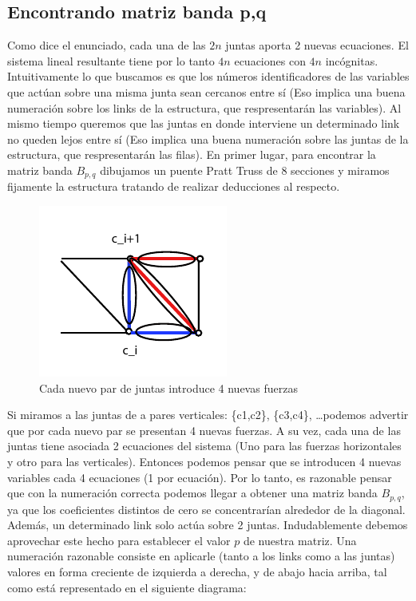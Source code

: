 \subsection{Encontrando matriz banda p,q}

Como dice el enunciado, cada una de las $2n$ juntas aporta 2 nuevas ecuaciones. El sistema lineal resultante tiene por lo tanto $4n$ ecuaciones con $4n$ incógnitas.
Intuitivamente lo que buscamos es que los números identificadores de las variables que actúan sobre una misma junta sean cercanos entre sí (Eso implica una buena numeración sobre los links de la estructura,
que respresentarán las variables).
Al mismo tiempo queremos que las juntas en donde interviene un determinado link no queden lejos entre sí (Eso implica una buena numeración sobre las juntas de la estructura, que respresentarán las filas).
En primer lugar, para encontrar la matriz banda $B_{p,q}$ dibujamos un puente Pratt Truss de 8 secciones y miramos fijamente la estructura tratando de realizar deducciones al respecto.

\begin{figure}[!h]
	\begin{center}
		  \includegraphics[keepaspectratio]{Imagenes/im_3.pdf}
		  \caption{Cada nuevo par de juntas introduce 4 nuevas fuerzas}
		  \label{fig:contra1}
	\end{center}
\end{figure}
\FloatBarrier

Si miramos a las juntas de a pares verticales: \{c1,c2\}, \{c3,c4\}, \ldots podemos advertir que por cada nuevo par se presentan 4 nuevas fuerzas. A su vez, cada una de las juntas tiene asociada 2 ecuaciones
del sistema (Uno para las fuerzas horizontales y otro para las verticales). Entonces podemos pensar que se introducen 4 nuevas variables cada 4 ecuaciones (1 por ecuación). Por lo tanto, es razonable pensar
que con la numeración correcta podemos llegar a obtener una matriz banda $B_{p,q}$, ya que los coeficientes distintos de cero se concentrarían alrededor de la diagonal. Además, un determinado link solo actúa 
sobre 2 juntas. Indudablemente debemos aprovechar este hecho para establecer el valor $p$ de nuestra matriz. Una numeración razonable consiste en aplicarle (tanto a los links como a las juntas) valores en
forma creciente de izquierda a derecha, y de abajo hacia arriba, tal como está representado en el siguiente diagrama:

